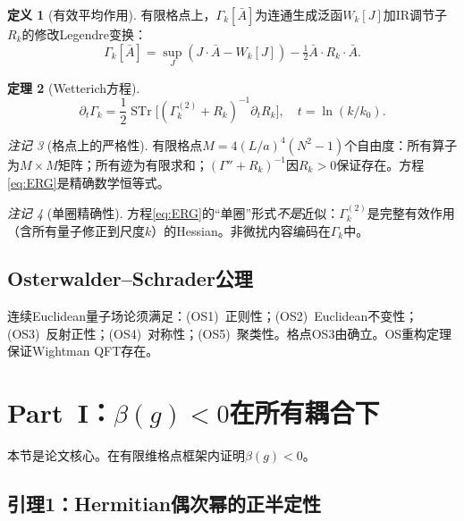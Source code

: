 \documentclass[12pt,a4paper]{article}
\theoremstyle{plain}
\newtheorem{theorem}{定理}[section]
\theoremstyle{definition}
\newtheorem{definition}[theorem]{定义}
\theoremstyle{remark}
\newtheorem{remark}[theorem]{注记}
\begin{document}
\begin{definition}[有效平均作用]\label{def:Gamma}
有限格点上，$\Gamma_k[\bar{A}]$为连通生成泛函$W_k[J]$加IR调节子$R_k$的修改Legendre变换：
\begin{equation}\label{eq:Gammadef}
\Gamma_k[\bar{A}] = \sup_J(J\cdot\bar{A} - W_k[J]) - \tfrac{1}{2}\bar{A}\cdot R_k\cdot\bar{A}.
\end{equation}
\end{definition}

\begin{theorem}[Wetterich方程\cite{Wetterich1993}]\label{thm:ERG}
\begin{equation}\label{eq:ERG}
\partial_t\Gamma_k = \frac{1}{2}\operatorname{STr}\!\Big[(\Gamma_k^{(2)}+R_k)^{-1}\partial_tR_k\Big], \quad t=\ln(k/k_0).
\end{equation}
\end{theorem}

\begin{remark}[格点上的严格性]\label{rem:rigorous}
有限格点$M=4(L/a)^4(N^2-1)$个自由度：所有算子为$M\times M$矩阵；所有迹为有限求和；$(\Gamma''+R_k)^{-1}$因$R_k>0$保证存在。方程\eqref{eq:ERG}是精确数学恒等式。
\end{remark}

\begin{remark}[单圈精确性]\label{rem:oneloop}
方程\eqref{eq:ERG}的``单圈''形式\emph{不是}近似：$\Gamma_k^{(2)}$是完整有效作用（含所有量子修正到尺度$k$）的Hessian。非微扰内容编码在$\Gamma_k$中。
\end{remark}

\subsection{Osterwalder--Schrader公理}\label{sec:OSaxioms}

连续Euclidean量子场论须满足\cite{OsterwalderSchrader1973,OsterwalderSchrader1975}：(OS1)~正则性；(OS2)~Euclidean不变性；(OS3)~反射正性；(OS4)~对称性；(OS5)~聚类性。格点OS3由\cite{OsterwalderSeiler1978}确立。OS重构定理保证Wightman QFT存在。

\section{Part~I：$\beta(g)<0$在所有耦合下}\label{sec:betaneg}

本节是论文核心。在有限维格点框架内证明$\beta(g)<0$。

\subsection{引理1：Hermitian偶次幂的正半定性}\label{sec:lemma1}
\end{document}
